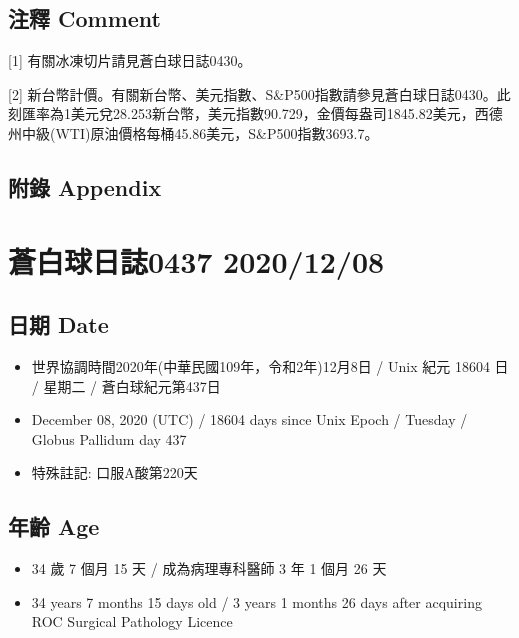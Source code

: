 \documentclass[
]{article}
\providecommand{\tightlist}{%
  \setlength{\itemsep}{0pt}\setlength{\parskip}{0pt}}
\begin{document}
\hypertarget{ux6ce8ux91cb-comment-6}{%
\subsection{注釋 Comment}\label{ux6ce8ux91cb-comment-6}}

{[}1{]} 有關冰凍切片請見蒼白球日誌0430。

{[}2{]}
新台幣計價。有關新台幣、美元指數、S\&P500指數請參見蒼白球日誌0430。此刻匯率為1美元兌28.253新台幣，美元指數90.729，金價每盎司1845.82美元，西德州中級(WTI)原油價格每桶45.86美元，S\&P500指數3693.7。

\hypertarget{ux9644ux9304-appendix-6}{%
\subsection{附錄 Appendix}\label{ux9644ux9304-appendix-6}}

\hypertarget{ux84bcux767dux7403ux65e5ux8a8c0437-20201208}{%
\section{蒼白球日誌0437
2020/12/08}\label{ux84bcux767dux7403ux65e5ux8a8c0437-20201208}}

\hypertarget{ux65e5ux671f-date-7}{%
\subsection{日期 Date}\label{ux65e5ux671f-date-7}}

\begin{itemize}
\tightlist
\item
  世界協調時間2020年(中華民國109年，令和2年)12月8日 / Unix 紀元 18604 日
  / 星期二 / 蒼白球紀元第437日
\item
  December 08, 2020 (UTC) / 18604 days since Unix Epoch / Tuesday /
  Globus Pallidum day 437
\item
  特殊註記: 口服A酸第220天
\end{itemize}

\hypertarget{ux5e74ux9f61-age-7}{%
\subsection{年齡 Age}\label{ux5e74ux9f61-age-7}}

\begin{itemize}
\tightlist
\item
  34 歲 7 個月 15 天 / 成為病理專科醫師 3 年 1 個月 26 天
\item
  34 years 7 months 15 days old / 3 years 1 months 26 days after
  acquiring ROC Surgical Pathology Licence
\end{itemize}
\end{document}
